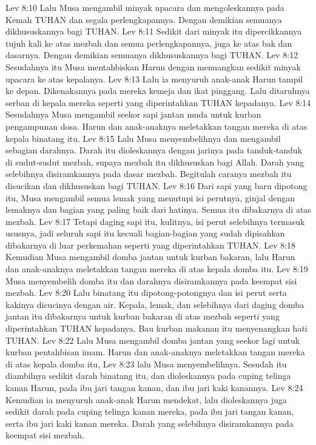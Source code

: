 Lev 8:10  Lalu Musa mengambil minyak upacara dan mengoleskannya pada Kemah TUHAN dan segala perlengkapannya. Dengan demikian semuanya dikhususkannya bagi TUHAN.
Lev 8:11  Sedikit dari minyak itu dipercikkannya tujuh kali ke atas mezbah dan semua perlengkapannya, juga ke atas bak dan dasarnya. Dengan demikian semuanya dikhususkannya bagi TUHAN.
Lev 8:12  Sesudahnya itu Musa mentahbiskan Harun dengan menuangkan sedikit minyak upacara ke atas kepalanya.
Lev 8:13  Lalu ia menyuruh anak-anak Harun tampil ke depan. Dikenakannya pada mereka kemeja dan ikat pinggang. Lalu ditaruhnya serban di kepala mereka seperti yang diperintahkan TUHAN kepadanya.
Lev 8:14  Sesudahnya Musa mengambil seekor sapi jantan muda untuk kurban pengampunan dosa. Harun dan anak-anaknya meletakkan tangan mereka di atas kepala binatang itu.
Lev 8:15  Lalu Musa menyembelihnya dan mengambil sebagian darahnya. Darah itu dioleskannya dengan jarinya pada tanduk-tanduk di sudut-sudut mezbah, supaya mezbah itu dikhususkan bagi Allah. Darah yang selebihnya disiramkannya pada dasar mezbah. Begitulah caranya mezbah itu disucikan dan dikhususkan bagi TUHAN.
Lev 8:16  Dari sapi yang baru dipotong itu, Musa mengambil semua lemak yang menutupi isi perutnya, ginjal dengan lemaknya dan bagian yang paling baik dari hatinya. Semua itu dibakarnya di atas mezbah.
Lev 8:17  Tetapi daging sapi itu, kulitnya, isi perut selebihnya termasuk ususnya, jadi seluruh sapi itu kecuali bagian-bagian yang sudah dipisahkan dibakarnya di luar perkemahan seperti yang diperintahkan TUHAN.
Lev 8:18  Kemudian Musa mengambil domba jantan untuk kurban bakaran, lalu Harun dan anak-anaknya meletakkan tangan mereka di atas kepala domba itu.
Lev 8:19  Musa menyembelih domba itu dan darahnya disiramkannya pada keempat sisi mezbah.
Lev 8:20  Lalu binatang itu dipotong-potongnya dan isi perut serta kakinya dicucinya dengan air. Kepala, lemak, dan selebihnya dari daging domba jantan itu dibakarnya untuk kurban bakaran di atas mezbah seperti yang diperintahkan TUHAN kepadanya. Bau kurban makanan itu menyenangkan hati TUHAN.
Lev 8:22  Lalu Musa mengambil domba jantan yang seekor lagi untuk kurban pentahbisan imam. Harun dan anak-anaknya meletakkan tangan mereka di atas kepala domba itu,
Lev 8:23  lalu Musa menyembelihnya. Sesudah itu diambilnya sedikit darah binatang itu, dan dioleskannya pada cuping telinga kanan Harun, pada ibu jari tangan kanan, dan ibu jari kaki kanannya.
Lev 8:24  Kemudian ia menyuruh anak-anak Harun mendekat, lalu dioleskannya juga sedikit darah pada cuping telinga kanan mereka, pada ibu jari tangan kanan, serta ibu jari kaki kanan mereka. Darah yang selebihnya disiramkannya pada keempat sisi mezbah.
